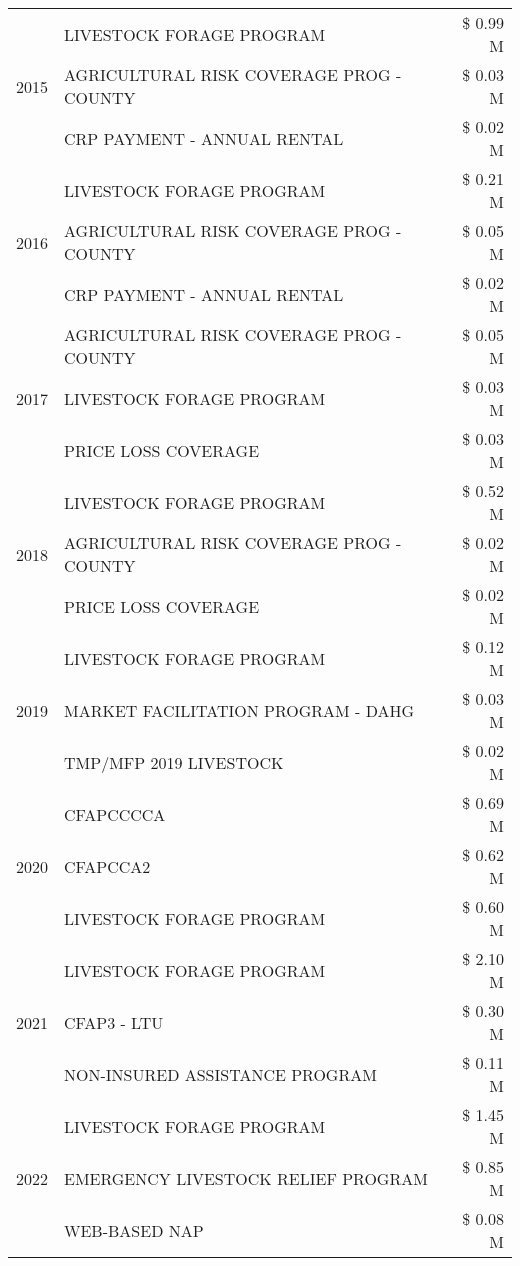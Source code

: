 \begin{tabular}{llr}
\cline{1-3}
\multirow[t]{3}{*}{2015} & LIVESTOCK FORAGE PROGRAM & \$ 0.99 M \\
 & AGRICULTURAL RISK COVERAGE PROG - COUNTY & \$ 0.03 M \\
 & CRP PAYMENT - ANNUAL RENTAL & \$ 0.02 M \\
\cline{1-3}
\multirow[t]{3}{*}{2016} & LIVESTOCK FORAGE PROGRAM & \$ 0.21 M \\
 & AGRICULTURAL RISK COVERAGE PROG - COUNTY & \$ 0.05 M \\
 & CRP PAYMENT - ANNUAL RENTAL & \$ 0.02 M \\
\cline{1-3}
\multirow[t]{3}{*}{2017} & AGRICULTURAL RISK COVERAGE PROG - COUNTY & \$ 0.05 M \\
 & LIVESTOCK FORAGE PROGRAM & \$ 0.03 M \\
 & PRICE LOSS COVERAGE & \$ 0.03 M \\
\cline{1-3}
\multirow[t]{3}{*}{2018} & LIVESTOCK FORAGE PROGRAM & \$ 0.52 M \\
 & AGRICULTURAL RISK COVERAGE PROG - COUNTY & \$ 0.02 M \\
 & PRICE LOSS COVERAGE & \$ 0.02 M \\
\cline{1-3}
\multirow[t]{3}{*}{2019} & LIVESTOCK FORAGE PROGRAM & \$ 0.12 M \\
 & MARKET FACILITATION PROGRAM - DAHG & \$ 0.03 M \\
 & TMP/MFP 2019 LIVESTOCK & \$ 0.02 M \\
\cline{1-3}
\multirow[t]{3}{*}{2020} & CFAPCCCCA & \$ 0.69 M \\
 & CFAPCCA2 & \$ 0.62 M \\
 & LIVESTOCK FORAGE PROGRAM & \$ 0.60 M \\
\cline{1-3}
\multirow[t]{3}{*}{2021} & LIVESTOCK FORAGE PROGRAM & \$ 2.10 M \\
 & CFAP3 - LTU & \$ 0.30 M \\
 & NON-INSURED ASSISTANCE PROGRAM & \$ 0.11 M \\
\cline{1-3}
\multirow[t]{3}{*}{2022} & LIVESTOCK FORAGE PROGRAM & \$ 1.45 M \\
 & EMERGENCY LIVESTOCK RELIEF PROGRAM & \$ 0.85 M \\
 & WEB-BASED NAP & \$ 0.08 M \\
\cline{1-3}
\bottomrule
\end{tabular}
